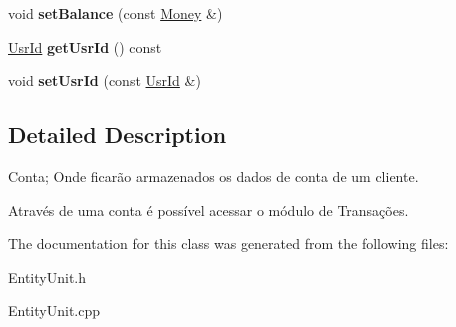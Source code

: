 \begin{DoxyCompactItemize}
\item 
\hypertarget{classAccount_a0c54b27c54fd64b93d31aecdf7f3f302}{void {\bfseries set\-Balance} (const \hyperlink{classMoney}{Money} \&)}\label{classAccount_a0c54b27c54fd64b93d31aecdf7f3f302}

\item 
\hypertarget{classAccount_a59a83e5c5142f79402e79a8d42b36aed}{\hyperlink{classUsrId}{Usr\-Id} {\bfseries get\-Usr\-Id} () const }\label{classAccount_a59a83e5c5142f79402e79a8d42b36aed}

\item 
\hypertarget{classAccount_a97146ede9747001294bcd41c74abd67a}{void {\bfseries set\-Usr\-Id} (const \hyperlink{classUsrId}{Usr\-Id} \&)}\label{classAccount_a97146ede9747001294bcd41c74abd67a}

\end{DoxyCompactItemize}


\subsection{Detailed Description}
Conta; Onde ficarão armazenados os dados de conta de um cliente. 

Através de uma conta é possível acessar o módulo de Transações. 

The documentation for this class was generated from the following files\-:\begin{DoxyCompactItemize}
\item 
Entity\-Unit.\-h\item 
Entity\-Unit.\-cpp\end{DoxyCompactItemize}
